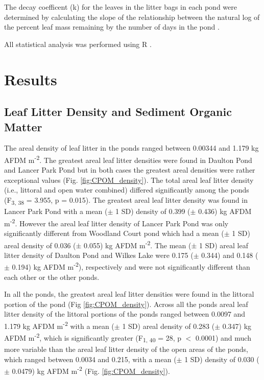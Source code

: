 \documentclass{article}
\begin{document}
The decay coefficent (k) for the leaves in the litter bags in each pond were determined by calculating the slope of the relationship between the natural log of the percent leaf mass remaining by the number of days in the pond \cite{Benfield_2007}.

All statistical analysis was performed using R \cite{R}.



\section{Results}
\subsection{Leaf Litter Density and Sediment Organic Matter}

The areal density of leaf litter in the ponds ranged between 0.00344 and 1.179 kg AFDM m\textsuperscript{-2}. The greatest areal leaf litter densities were found in Daulton Pond and Lancer Park Pond but in both cases the greatest areal densities were rather exceptional values (Fig. \ref{fig:CPOM_density}). The total areal leaf litter density (i.e., littoral and open water combined) differed significantly among the ponds (F\textsubscript{3, 38} = 3.955, p = 0.015). The greatest areal leaf litter density was found in Lancer Park Pond with a mean ($\pm$ 1 SD) density of 0.399 ($\pm$ 0.436) kg AFDM m\textsuperscript{-2}. However the areal leaf litter density of Lancer Park Pond was only significantly different from Woodland Court pond which had a mean ($\pm$ 1 SD) areal density of 0.036 ($\pm$ 0.055) kg AFDM m\textsuperscript{-2}. The mean ($\pm$ 1 SD) areal leaf litter density of Daulton Pond and Wilkes Lake were 0.175 ($\pm$ 0.344) and 0.148 ($\pm$ 0.194) kg AFDM m\textsuperscript{-2}), respectively and were not significantly different than each other or the other ponds. 

In all the ponds, the greatest areal leaf litter densities were found in the littoral portion of the pond (Fig \ref{fig:CPOM_density}). Across all the ponds areal leaf litter density of the littoral portions of the ponds ranged between 0.0097 and 1.179 kg AFDM m\textsuperscript{-2} with a mean ($\pm$ 1 SD) areal density of 0.283 ($\pm$ 0.347) kg AFDM m\textsuperscript{-2}, which is significantly greater (F\textsubscript{1, 40} = 28, p $<$ 0.0001) and much more variable than the areal leaf litter density of the open areas of the ponds, which ranged between 0.0034 and 0.215, with a mean ($\pm$ 1 SD) density of 0.030 ($\pm$ 0.0479) kg AFDM m\textsuperscript{-2} (Fig. \ref{fig:CPOM_density}). 
\end{document}
